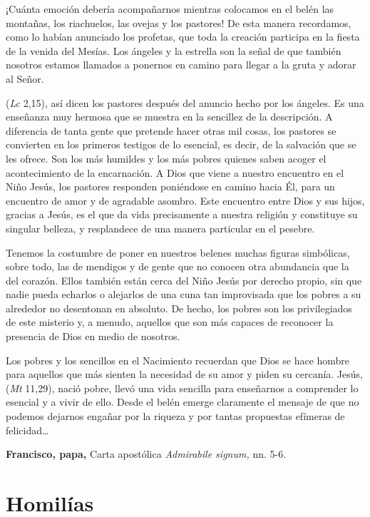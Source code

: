 \begin{body}
\begin{body}
¡Cuánta emoción debería acompañarnos mientras colocamos en el belén las montañas, los riachuelos, las ovejas y los pastores! De esta manera recordamos, como lo habían anunciado los profetas, que toda la creación participa en la fiesta de la venida del Mesías. Los ángeles y la estrella son la señal de que también nosotros estamos llamados a ponernos en camino para llegar a la gruta y adorar al Señor.

 (\emph{Lc} 2,15), así dicen los pastores después del anuncio hecho por los ángeles. Es una enseñanza muy hermosa que se muestra en la sencillez de la descripción. A diferencia de tanta gente que pretende hacer otras mil cosas, los pastores se convierten en los primeros testigos de lo esencial, es decir, de la salvación que se les ofrece. Son los más humildes y los más pobres quienes saben acoger el acontecimiento de la encarnación. A Dios que viene a nuestro encuentro en el Niño Jesús, los pastores responden poniéndose en camino hacia Él, para un encuentro de amor y de agradable asombro. Este encuentro entre Dios y sus hijos, gracias a Jesús, es el que da vida precisamente a nuestra religión y constituye su singular belleza, y resplandece de una manera particular en el pesebre.

Tenemos la costumbre de poner en nuestros belenes muchas figuras simbólicas, sobre todo, las de mendigos y de gente que no conocen otra abundancia que la del corazón. Ellos también están cerca del Niño Jesús por derecho propio, sin que nadie pueda echarlos o alejarlos de una cuna tan improvisada que los pobres a su alrededor no desentonan en absoluto. De hecho, los pobres son los privilegiados de este misterio y, a menudo, aquellos que son más capaces de reconocer la presencia de Dios en medio de nosotros.

Los pobres y los sencillos en el Nacimiento recuerdan que Dios se hace hombre para aquellos que más sienten la necesidad de su amor y piden su cercanía. Jesús,  (\emph{Mt} 11,29), nació pobre, llevó una vida sencilla para enseñarnos a comprender lo esencial y a vivir de ello. Desde el belén emerge claramente el mensaje de que no podemos dejarnos engañar por la riqueza y por tantas propuestas efímeras de felicidad\ldots{}

\textbf{Francisco, papa,} Carta apostólica \emph{Admirabile signum,} nn. 5-6.

\section{Homilías}


\end{body}
\end{body}
